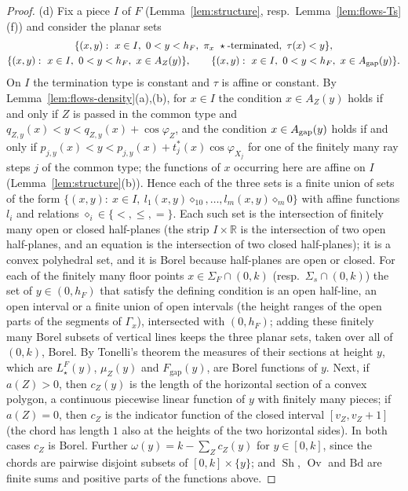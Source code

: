 \documentclass[11pt]{amsart}
\newcommand{\R}{\mathbb R}
\newcommand{\Sh}{\operatorname{Sh}}
\newcommand{\Ov}{\operatorname{Ov}}
\newcommand{\Fgap}{F_{\mathrm{gap}}}
\theoremstyle{definition}
\theoremstyle{remark}
\numberwithin{equation}{section}
\begin{document}
\begin{proof}
(d) Fix a piece $I$ of $F$ (Lemma~\ref{lem:structure}, resp.\ Lemma~\ref{lem:flows-Ts}(f)) and consider the planar sets
\begin{gather*}
\{(x,y):\ x\in I,\ 0<y<h_F,\ \pi_x\ \star\text{-terminated},\ \tau(x)<y\},\\
\{(x,y):\ x\in I,\ 0<y<h_F,\ x\in A_Z(y)\},\qquad \{(x,y):\ x\in I,\ 0<y<h_F,\ x\in A_{\rm gap}(y)\}.
\end{gather*}
On $I$ the termination type is constant and $\tau$ is affine or constant. By Lemma~\ref{lem:flows-density}(a),(b), for
$x\in I$ the condition $x\in A_Z(y)$ holds if and only if $Z$ is passed in the common type and
$q_{Z,y}(x)<y<q_{Z,y}(x)+\cos\varphi_Z$, and the condition $x\in A_{\rm gap}(y)$ holds if and only if
$p_{j,y}(x)<y<p_{j,y}(x)+t^*_j(x)\cos\varphi_{X_j}$ for one of the finitely many ray steps $j$ of the common type; the
functions of $x$ occurring here are affine on $I$ (Lemma~\ref{lem:structure}(b)). Hence each of the three sets is a finite
union of sets of the form $\{(x,y):\ x\in I,\ l_1(x,y)\diamond_10,\dots,l_m(x,y)\diamond_m0\}$ with affine functions $l_i$
and relations $\diamond_i\in\{<,\le,=\}$. Each such set is the intersection of finitely many open or closed half-planes
(the strip $I\times\R$ is the intersection of two open half-planes, and an equation is the intersection of two closed
half-planes); it is a convex polyhedral set, and it is Borel because half-planes are open or closed. For each of the
finitely many floor points $x\in\Sigma_F\cap(0,k)$ (resp.\ $\Sigma_s\cap(0,k)$) the set of $y\in(0,h_F)$ that satisfy
the defining condition is an open half-line, an open interval or a finite union of open intervals (the height ranges of
the open parts of the segments of $\Gamma_x$), intersected with $(0,h_F)$; adding these finitely many Borel subsets of
vertical lines keeps the three planar sets, taken over all of $(0,k)$, Borel. By Tonelli's theorem the measures of
their sections at height $y$, which are $L^F_\star(y)$, $\mu_Z(y)$ and $\Fgap(y)$, are Borel functions of $y$. Next, if
$a(Z)>0$, then $c_Z(y)$ is the length of the horizontal section of a convex polygon, a continuous piecewise linear
function of $y$ with finitely many pieces; if $a(Z)=0$, then $c_Z$ is the indicator function of the closed interval
$[v_Z,v_Z+1]$ (the chord has length $1$ also at the heights of the two horizontal sides). In both cases $c_Z$ is Borel.
Further $\omega(y)=k-\sum_Zc_Z(y)$ for $y\in[0,k]$, since the chords are pairwise disjoint subsets of
$[0,k]\times\{y\}$; and $\Sh$, $\Ov$ and $\mathrm{Bd}$ are finite sums and positive parts of the functions above.
\end{proof}
\end{document}
